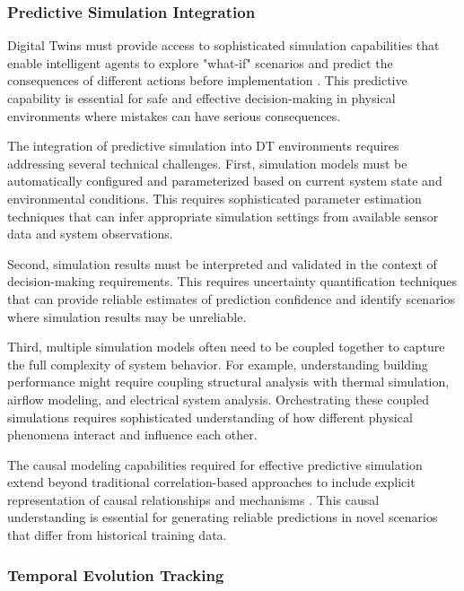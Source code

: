\subsubsection{Predictive Simulation Integration}

Digital Twins must provide access to sophisticated simulation capabilities that enable intelligent agents to explore "what-if" scenarios and predict the consequences of different actions before implementation \cite{negri2017review, kritzinger2018digital}. This predictive capability is essential for safe and effective decision-making in physical environments where mistakes can have serious consequences.

The integration of predictive simulation into DT environments requires addressing several technical challenges. First, simulation models must be automatically configured and parameterized based on current system state and environmental conditions. This requires sophisticated parameter estimation techniques that can infer appropriate simulation settings from available sensor data and system observations.

Second, simulation results must be interpreted and validated in the context of decision-making requirements. This requires uncertainty quantification techniques that can provide reliable estimates of prediction confidence and identify scenarios where simulation results may be unreliable.

Third, multiple simulation models often need to be coupled together to capture the full complexity of system behavior. For example, understanding building performance might require coupling structural analysis with thermal simulation, airflow modeling, and electrical system analysis. Orchestrating these coupled simulations requires sophisticated understanding of how different physical phenomena interact and influence each other.

The causal modeling capabilities required for effective predictive simulation extend beyond traditional correlation-based approaches to include explicit representation of causal relationships and mechanisms \cite{pearl2019seven}. This causal understanding is essential for generating reliable predictions in novel scenarios that differ from historical training data.

\subsubsection{Temporal Evolution Tracking}

